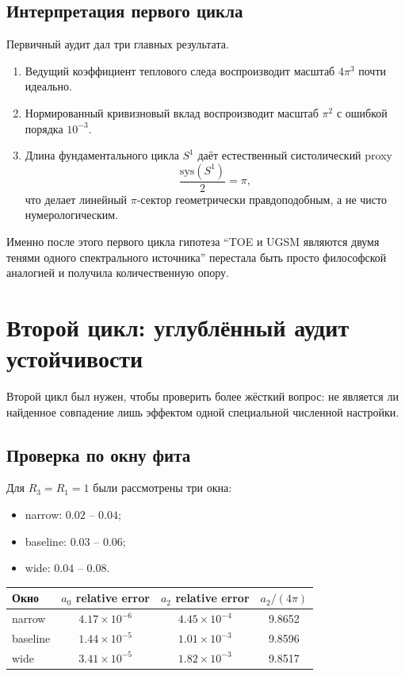 \documentclass[12pt,a4paper]{article}
\begin{document}
\subsection{Интерпретация первого цикла}

Первичный аудит дал три главных результата.
\begin{enumerate}
    \item Ведущий коэффициент теплового следа воспроизводит масштаб \(4\pi^3\) почти идеально.
    \item Нормированный кривизновый вклад воспроизводит масштаб \(\pi^2\) с ошибкой порядка \(10^{-3}\).
    \item Длина фундаментального цикла \(S^1\) даёт естественный систолический proxy
    \[
    \frac{\mathrm{sys}(S^1)}{2}=\pi,
    \]
    что делает линейный \(\pi\)-сектор геометрически правдоподобным, а не чисто нумерологическим.
\end{enumerate}

Именно после этого первого цикла гипотеза ``TOE и UGSM являются двумя тенями одного спектрального источника'' перестала быть просто философской аналогией и получила количественную опору.

\section{Второй цикл: углублённый аудит устойчивости}

Второй цикл был нужен, чтобы проверить более жёсткий вопрос: не является ли найденное совпадение лишь эффектом одной специальной численной настройки.

\subsection{Проверка по окну фита}

Для \(R_3=R_1=1\) были рассмотрены три окна:
\begin{itemize}
    \item narrow: \(0.02\) -- \(0.04\);
    \item baseline: \(0.03\) -- \(0.06\);
    \item wide: \(0.04\) -- \(0.08\).
\end{itemize}

\begin{center}
\begin{tabular}{lccc}
\toprule
Окно & $a_0$ relative error & $a_2$ relative error & $a_2/(4\pi)$ \\
\midrule
narrow & $4.17\times 10^{-6}$ & $4.45\times 10^{-4}$ & 9.8652 \\
baseline & $1.44\times 10^{-5}$ & $1.01\times 10^{-3}$ & 9.8596 \\
wide & $3.41\times 10^{-5}$ & $1.82\times 10^{-3}$ & 9.8517 \\
\bottomrule
\end{tabular}
\end{center}
\end{document}

